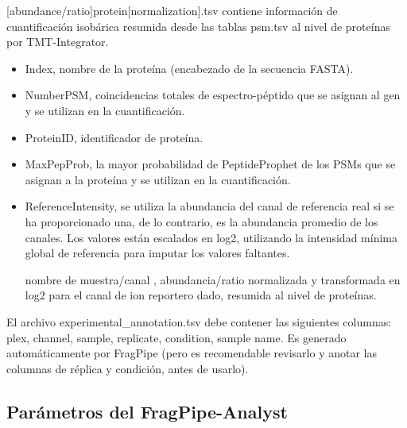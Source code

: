 \documentclass[nochap]{config/ejercicios}
\begin{document}
[abundance/ratio]protein[normalization].tsv contiene información de cuantificación isobárica resumida desde las tablas psm.tsv al nivel de proteínas por TMT-Integrator.
\begin{itemize}
\item Index, nombre de la proteína (encabezado de la secuencia FASTA).
\item NumberPSM, coincidencias totales de espectro-péptido que se asignan al gen y se utilizan en la cuantificación.
\item ProteinID, identificador de proteína.
\item MaxPepProb, la mayor probabilidad de PeptideProphet de los PSMs que se asignan a la proteína y se utilizan en la cuantificación.
\item ReferenceIntensity, se utiliza la abundancia del canal de referencia real si se ha proporcionado una, de lo contrario, es la abundancia promedio de los canales. Los valores están escalados en log2, utilizando la intensidad mínima global de referencia para imputar los valores faltantes. 
\item  [nombre de muestra/canal], abundancia/ratio normalizada y transformada en log2 para el canal de ion reportero dado, resumida al nivel de proteínas.
\end{itemize}

El archivo experimental\_annotation.tsv debe contener las siguientes columnas: plex, channel, sample, replicate, condition, sample name. Es generado automáticamente por FragPipe (pero es recomendable revisarlo y anotar las columnas de réplica y condición, antes de usarlo).

\subsection{Parámetros del FragPipe-Analyst}
\end{document}
